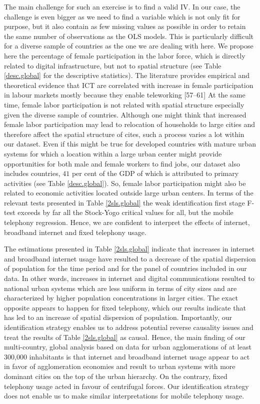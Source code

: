 \documentclass[10pt,letterpaper]{article}
\begin{document}
The main challenge for such an exercise is to find a valid IV. In our
case, the challenge is even bigger as we need to find a variable which
is not only fit for purpose, but it also contain as few missing values
as possible in order to retain the same number of observations as the
OLS models. This is particularly difficult for a diverse sample of
countries as the one we are dealing with here. We propose here the
percentage of female participation in the labor force, which is directly
related to digital infrastructure, but not to spatial structure (see
Table \ref{desc.global} for the descriptive statistics). \color{blue}
The literature provides empirical and theoretical evidence that ICT are
correlated with increase in female participation in labour markets
mostly because they enable teleworking {[}57--61{]} \color{black} At the
same time, female labor participation is not related with spatial
structure especially given the diverse sample of countries. Although one
might think that increased female labor participation may lead to
relocation of households to large cities and therefore affect the
spatial structure of cites, such a process varies a lot within our
dataset. Even if this might be true for developed countries with mature
urban systems for which a location within a large urban center might
provide opportunities for both male and female workers to find jobs, our
dataset also includes countries, \(41\) per cent of the GDP of which is
attributed to primary activities (see Table \ref{desc.global}). So,
female labor participation might also be related to economic activities
located outside large urban centers. In terms of the relevant tests
presented in Table \ref{2sls.global} the weak identification first stage
F-test exceeds by far all the Stock-Yogo critical values for all, but
the mobile telephony regression. Hence, we are confident to interpret
the effects of internet, broadband internet and fixed telephony usage.

The estimations presented in Table \ref{2sls.global} indicate that
increases in internet and broadband internet usage have resulted to a
decrease of the spatial dispersion of population for the time period and
for the panel of countries included in our data. In other words,
increases in internet and digital communications resulted to national
urban systems which are less uniform in terms of city sizes and are
characterized by higher population concentrations in larger cities. The
exact opposite appears to happen for fixed telephony, which our results
indicate that has led to an increase of spatial dispersion of
population. Importantly, our identification strategy enables us to
address potential reverse causality issues and treat the results of
Table \ref{2sls.global} as causal. Hence, the main finding of our
multi-country, global analysis based on data for urban agglomerations of
at least 300,000 inhabitants is that internet and broadband internet
usage appear to act in favor of agglomeration economies and result to
urban systems with more dominant cities on the top of the urban
hierarchy. On the contrary, fixed telephony usage acted in favour of
centrifugal forces. Our identification strategy does not enable us to
make similar interpretations for mobile telephony usage.
\end{document}

